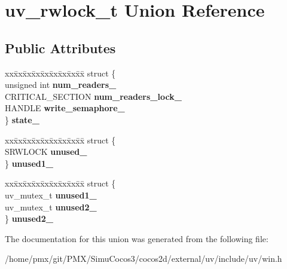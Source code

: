 \hypertarget{unionuv__rwlock__t}{}\section{uv\+\_\+rwlock\+\_\+t Union Reference}
\label{unionuv__rwlock__t}
\subsection*{Public Attributes}
\begin{DoxyCompactItemize}
\item 
\mbox{\label{unionuv__rwlock__t_ae54b2801bbf4b5bfa8e36f59b8c80833}} 
\begin{tabbing}
xx\=xx\=xx\=xx\=xx\=xx\=xx\=xx\=xx\=\kill
struct \{\\
\>unsigned int {\bfseries num\_readers\_}\\
\>CRITICAL\_SECTION {\bfseries num\_readers\_lock\_}\\
\>HANDLE {\bfseries write\_semaphore\_}\\
\} {\bfseries state\_}\\

\end{tabbing}\item 
\mbox{\label{unionuv__rwlock__t_ac54d6c0ab60321427a8eef965def3df8}} 
\begin{tabbing}
xx\=xx\=xx\=xx\=xx\=xx\=xx\=xx\=xx\=\kill
struct \{\\
\>SRWLOCK {\bfseries unused\_}\\
\} {\bfseries unused1\_}\\

\end{tabbing}\item 
\mbox{\label{unionuv__rwlock__t_a2389f2b3c1ed36e430fbb428b6aef93a}} 
\begin{tabbing}
xx\=xx\=xx\=xx\=xx\=xx\=xx\=xx\=xx\=\kill
struct \{\\
\>uv\_mutex\_t {\bfseries unused1\_}\\
\>uv\_mutex\_t {\bfseries unused2\_}\\
\} {\bfseries unused2\_}\\

\end{tabbing}\end{DoxyCompactItemize}


The documentation for this union was generated from the following file\+:\begin{DoxyCompactItemize}
\item 
/home/pmx/git/\+P\+M\+X/\+Simu\+Cocos3/cocos2d/external/uv/include/uv/win.\+h\end{DoxyCompactItemize}
